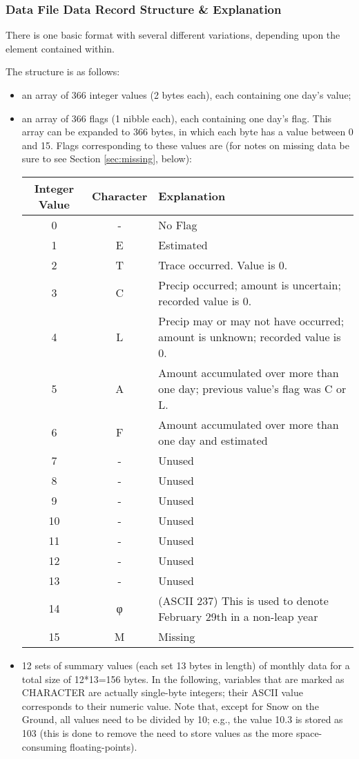 \documentclass[12pt]{article}
\begin{document}
\subsubsection{Data File Data Record Structure \& Explanation}
There is one basic format with several different variations, depending upon the element contained within. 

The structure is as follows:
\begin{itemize}
\item an array of 366 integer values (2 bytes each), each containing one day's value; 
\item an array of 366 flags (1 nibble each), each containing one day's flag. This array can be expanded to 366 bytes, in which each byte has a value between 0 and 15.  Flags corresponding to these values are (for notes on missing data be sure to see Section \ref{sec:missing}, below):
	\begin{center}
	\begin{tabular}{c | c | p{8cm}}
	Integer Value & Character & Explanation \\
	\hline
	0 & - & No Flag \\
	1 & E & Estimated\\
	2 & T & Trace occurred. Value is 0. \\
	3 & C & Precip occurred; amount is uncertain; recorded value is 0. \\
	4 & L & Precip may or may not have occurred; amount is unknown; recorded value is 0. \\
	5 & A & Amount accumulated over more than one day; previous value's flag was C or L. \\
	6 & F & Amount accumulated over more than one day and estimated \\
	\hline
	7 & - & Unused \\
	8 & - & Unused \\
	9 & - & Unused \\
	10 & - & Unused \\
	11 & - & Unused \\
	12 & - & Unused \\
	13 & - & Unused \\
	\hline
	14 & φ & (ASCII 237) This is used to denote February 29th in a non-leap year \\
	15 & M & Missing
	\end{tabular}
	\end{center}
\item 12 sets of summary values (each set 13 bytes in length) of monthly data for a total size of 12*13=156 bytes. In the following, variables that are marked as CHARACTER are actually single-byte integers; their ASCII value corresponds to their numeric value. Note that, except for Snow on the Ground, all values need to be divided by 10; e.g., the value 10.3 is stored as 103 (this is done to remove the need to store values as the more space-consuming floating-points).

\end{itemize}
\end{document}
